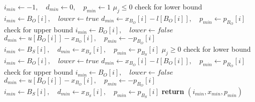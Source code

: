 \documentclass[a4paper]{article}
\begin{document}
\begin{algorithmic}
\State $i_{min} \gets -1, \quad d_{min} \gets 0, \quad  p_{min} \gets 1$
\Comment $\mu_{j} \leq 0$
            \Comment check for lower bound
                \State $i_{min} \gets B_{O}[i], \quad lower \gets true$
                \State $d_{min} \gets x_{B_{O}}[i]-l[B_{O}[i]],
                            \quad p_{min} \gets p_{B_{O}}[i]$
            \EndIf
        \EndIf 
            \Comment check for upper bound
                \State $i_{min} \gets B_{O}[i], \quad lower \gets false$
                \State $d_{min} \gets u[B_{O}[i]]-x_{B_{O}}[i],
                            \quad p_{min} \gets -p_{B_{O}}[i]$
            \EndIf
        \EndIf 
    \EndFor
                \State $i_{min} \gets B_{S}[i],
                            \quad d_{min} \gets x_{B_{S}}[i],
                            \quad p_{min} \gets p_{B_{S}}[i]$
            \EndIf	
        \EndIf 
    \EndFor
\Else
\Comment $\mu_{j} \geq 0$
            \Comment check for lower bound
                \State $i_{min} \gets B_{O}[i], \quad lower \gets true$
                \State $d_{min} \gets x_{B_{O}}[i]-l[B_{O}[i]],
                            \quad p_{min} \gets p_{B_{O}}[i]$
            \EndIf
        \EndIf
            \Comment check for upper bound
                \State $i_{min} \gets B_{O}[i], \quad lower \gets false$
                \State $d_{min} \gets u[B_{O}[i]]-x_{B_{O}}[i],
                            \quad p_{min} \gets -p_{B_{O}}[i]$
            \EndIf
        \EndIf 
    \EndFor
                \State $i_{min} \gets B_{S}[i],
                            \quad d_{min} \gets x_{B_{S}}[i],
                            \quad p_{min} \gets p_{B_{S}}[i]$
            \EndIf	
        \EndIf 
    \EndFor
\EndIf
\State \textbf{return} $(i_{min}, x_{min}, p_{min})$
\EndFunction
\end{algorithmic}
\end{document}

